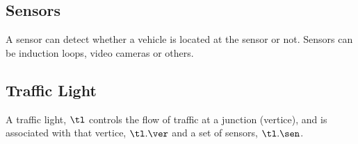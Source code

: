 \subsection{Sensors}
A sensor can detect whether a vehicle is located at the sensor or not. Sensors can be induction loops, video cameras or others.

\subsection{Traffic Light}
A traffic light, $\tl$ controls the flow of traffic at a junction (vertice), and is associated with that vertice, $\tl.\ver$ and a set of sensors, $\tl.\sen$.





